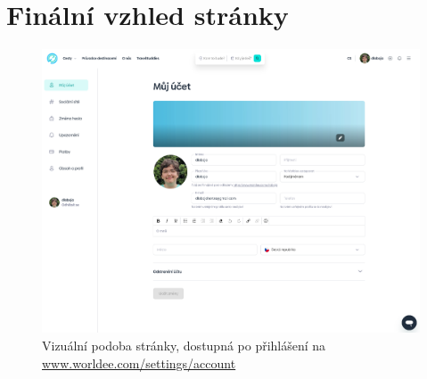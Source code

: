 \section{Finální vzhled stránky}

\begin{figure}[h!]
    \centering
    \includegraphics[width=1\linewidth]{obrazky/finalni_stranka.png}
    \caption[Vizuální podoba stránky]{Vizuální podoba stránky, dostupná po přihlášení na \\\href{https://www.worldee.com/cz/settings/account}{www.worldee.com/settings/account}}
\end{figure}